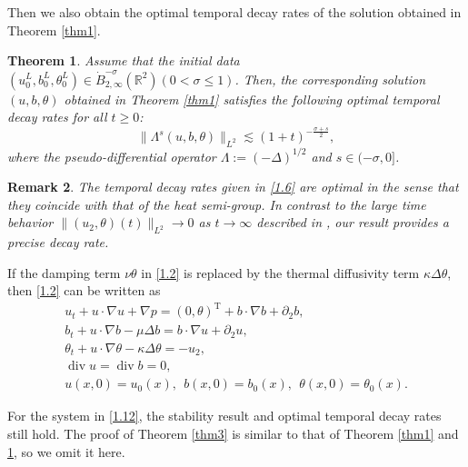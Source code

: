 \documentclass[10pt,a4paper]{amsart}
\numberwithin{equation}{section}
\newtheorem{theorem}{Theorem}[section]
\newtheorem{remark}[theorem]{Remark}
\begin{document}
Then we also obtain the optimal temporal decay rates of the solution obtained in Theorem \ref{thm1}.

\begin{theorem}\label{thm2}
Assume that the initial data $(u_0^L,b_0^L,\theta_0^L)\in \dot{B}^{-\sigma}_{2,\infty}(\mathbb{R}^2)(0<\sigma\leqslant 1)$. Then,
the corresponding solution $(u,b,\theta)$ obtained in Theorem \ref{thm1} satisfies the following optimal temporal decay rates for all $t\geqslant 0$:
\begin{equation} \label{1.6}
\|\Lambda^s(u,b,\theta)\|_{L^2}\lesssim(1+t)^{-\frac{\sigma+s}{2}},
\end{equation}
where the pseudo-differential operator 
$\Lambda:=(-\Delta)^{1/2}$ and $s\in(-\sigma,0]$.
\end{theorem}

\begin{remark} \rm
The temporal decay rates given in \eqref{1.6} are optimal in the sense that they 
coincide with that of the heat semi-group. In contrast to the large time behavior 
$\|(u_2,\theta)(t)\|_{L^2}\to 0$  as $t\to\infty$ described in \cite{MR4790886}, 
our result provides a precise decay rate.
 \end{remark}

 If the damping term $\nu\theta$ in \eqref{1.2} is replaced by the thermal diffusivity term
 $\kappa\Delta\theta$, then \eqref{1.2} can be written as
 \begin{equation}\label{1.12}
 \begin{gathered}
 u_t+ u\cdot \nabla u+\nabla p= (0,\theta)^\mathrm{T}+ b\cdot \nabla b+\partial_2b,\\
 b_t+u\cdot\nabla b-\mu\Delta b=b\cdot\nabla u+\partial_2u,\\
 \theta_t+u\cdot \nabla \theta-\kappa\Delta\theta=-u_2,\\
 \operatorname{div} u=\operatorname{div} b=0,\\
 u(x,0)=u_0(x),\ \ b(x,0)=b_0(x),\ \ \theta(x,0)=\theta_0(x).
 \end{gathered}
 \end{equation}

 For the system in \eqref{1.12}, the stability result and optimal temporal decay rates still hold.
 The proof of Theorem \ref{thm3} is similar to that of Theorem \ref{thm1} and \ref{thm2}, so we omit it here.
\end{document}
